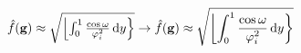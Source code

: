 \documentclass{article}
\def\maths{%
\hat f({\bf g})\approx\sqrt{\left\lfloor\int_0^1\frac{\cos\omega}{\varphi^2_i}\,{\rm d}y\right\}
}}
\begin{document}
$\maths \to \displaystyle\maths$
\end{document}
